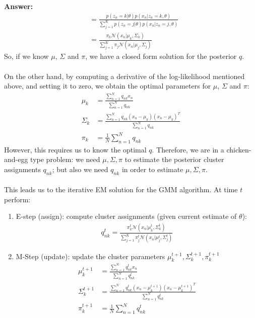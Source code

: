 \documentclass{article}
\newenvironment{QandA}{\begin{enumerate}[label=\arabic*.]}{\end{enumerate}}
\newenvironment{InnerQandA}{\begin{enumerate}[label=\roman*.]}{\end{enumerate}}
\newenvironment{answer}{\par\normalfont \textbf{Answer:}}{}
\newcommand{\g}{\vert}
\begin{document}
\begin{QandA}
\begin{InnerQandA}
\begin{answer}
\begin{align*}
                &= \frac{p(z_n=k \g \theta)p(x_n \g z_n = k, \theta)}{\sum_{j=1}^K p(z_n=j \g \theta)p(x_n \g z_n = j, \theta)} \\
                &= \frac{\pi_k \mathcal{N}(x_n \g \mu_k, \Sigma_k)}{\sum_{j=1}^K \pi_j \mathcal{N}(x_n \g \mu_j, \Sigma_j)}
            \end{align*}
            So, if we know $\mu$, $\Sigma$ and $\pi$, we have a closed form solution for the posterior $q$. \\\\
            On the other hand, by computing a derivative of the log-likelihood mentioned above, and setting it to zero, we obtain the optimal parameters for $\mu$, $\Sigma$ and $\pi$:
            \begin{align*}
                \mu_k &= \frac{\sum_{n=1}^N q_{nk} x_n}{\sum_{n=1}^N q_{nk}}\\
                \Sigma_k &= \frac{\sum_{n=1}^N q_{nk}(x_n - \mu_k)(x_n - \mu_k)^T}{\sum_{n=1}^N q_{nk}} \\
                \pi_k &= \frac{1}{N}\sum_{n=1}^N q_{nk}
            \end{align*}
            However, this requires us to know the optimal $q$. Therefore, we are in a chicken-and-egg type problem: we need $\mu, \Sigma, \pi$ to estimate the posterior cluster assignments $q_{nk}$; but also we need $q_{nk}$ in order to estimate $\mu, \Sigma, \pi$. \\\\
            This leads us to the iterative EM solution for the GMM algorithm. At time $t$ perform:
            \begin{enumerate}[label=\arabic*.]
                \item E-step (assign): compute cluster assignments (given current estimate of $\theta$):
                \begin{align*}
                    q_{nk}^t = \frac{\pi_k^t \mathcal{N}(x_n \g \mu_k^t, \Sigma_k^t)}{\sum_{j=1}^K \pi_j^t \mathcal{N}(x_n \g \mu_j^t, \Sigma_j^t)}
                \end{align*}
                \item M-Step (update): update the cluster parameters $\mu_k^{t+1}, \Sigma_{k}^{t+1}, \pi_k^{t+1}$
                \begin{align*}
                \mu_k^{t+1} &= \frac{\sum_{n=1}^N q_{nk}^t x_n}{\sum_{n=1}^N q_{nk}^t}\\
                \Sigma_k^{t+1} &= \frac{\sum_{n=1}^N q_{nk}^t(x_n - \mu_k^{t+1})(x_n - \mu_k^{t+1})^T}{\sum_{n=1}^N q_{nk}^t} \\
                \pi_k^{t+1} &= \frac{1}{N}\sum_{n=1}^N q_{nk}^t
            \end{align*}
            \end{enumerate}


\end{answer}
\end{InnerQandA}
\end{QandA}
\end{document}

